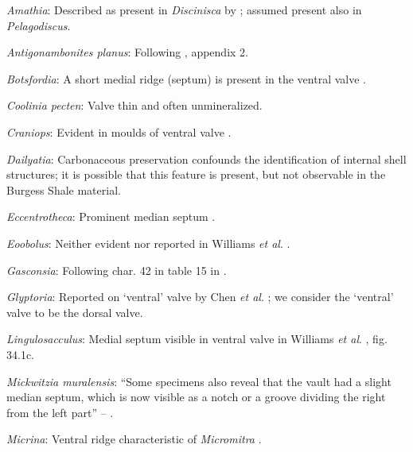 \documentclass[openany]{book}
\theoremstyle{definition}
\theoremstyle{definition}
\theoremstyle{definition}
\theoremstyle{remark}
\begin{document}
\hypertarget{Amathia-coding-117}{}
\emph{Amathia}: Described as present in \emph{Discinisca} by
\citet{Chen2007Reinterpretationof}; assumed present also in
\emph{Pelagodiscus}.

\hypertarget{Antigonambonites_planus-coding-117}{}
\emph{Antigonambonites planus}: Following
\citet{Williams1998Thediversity}, appendix 2.

\hypertarget{Botsfordia-coding-117}{}
\emph{Botsfordia}: A short medial ridge (septum) is present in the
ventral valve \citep{Topper2013Reappraisalof}.

\hypertarget{Coolinia_pecten-coding-117}{}
\emph{Coolinia pecten}: Valve thin and often unmineralized.

\hypertarget{Craniops-coding-117}{}
\emph{Craniops}: Evident in moulds of ventral valve
\citep{Hanken1985Thetaxonomy, Watkins2002Newrecord}.

\hypertarget{Dailyatia-coding-117}{}
\emph{Dailyatia}: Carbonaceous preservation confounds the identification
of internal shell structures; it is possible that this feature is
present, but not observable in the Burgess Shale material.

\hypertarget{Eccentrotheca-coding-117}{}
\emph{Eccentrotheca}: Prominent median septum \citep[fig. 4d, e
in][]{Balthasar2009Thebrachiopod}.

\hypertarget{Eoobolus-coding-117}{}
\emph{Eoobolus}: Neither evident nor reported in Williams \emph{et al}.
\citeyearpar{Williams2000LinguliformeaCraniiformea}.

\hypertarget{Gasconsia-coding-117}{}
\emph{Gasconsia}: Following char. 42 in table 15 in
\citet{Williams2000LinguliformeaCraniiformea}.

\hypertarget{Glyptoria-coding-117}{}
\emph{Glyptoria}: Reported on `ventral' valve by Chen \emph{et al}.
\citeyearpar{Chen2007Reinterpretationof}; we consider the `ventral'
valve to be the dorsal valve.

\hypertarget{Lingulosacculus-coding-117}{}
\emph{Lingulosacculus}: Medial septum visible in ventral valve in
Williams \emph{et al}.
\citeyearpar{Williams2000LinguliformeaCraniiformea}, fig. 34.1c.

\hypertarget{Mickwitzia_muralensis-coding-117}{}
\emph{Mickwitzia muralensis}: ``Some specimens also reveal that the
vault had a slight median septum, which is now visible as a notch or a
groove dividing the right from the left part'' --
\citet{Balthasar2008iMummpikia}.

\hypertarget{Micrina-coding-117}{}
\emph{Micrina}: Ventral ridge characteristic of \emph{Micromitra}
\citep{Skovsted2010EarlyCambrian}.
\end{document}
